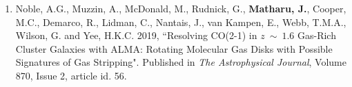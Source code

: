 \documentclass[11pt]{article}
\makeatletter
\newlength{\bibhang}
\newlength{\bibsep}
 {\@listi \global\bibsep\itemsep \global\advance\bibsep by\parsep}
\newenvironment{bibsection}%
        {\begin{enumerate}{}{%
       \setlength{\leftmargin}{\bibhang}%
       \setlength{\itemindent}{-\leftmargin}%
       \setlength{\itemsep}{\bibsep}%
       \setlength{\parsep}{\z@}%
        \setlength{\partopsep}{0pt}%
        \setlength{\topsep}{0pt}}}
        {\end{enumerate}\vspace{-.6\baselineskip}}
\renewcommand{\section}[1]{\pagebreak[3]%
    \hyphenpenalty=10000%
    \vspace{1.3\baselineskip}%
    \phantomsection\addcontentsline{toc}{section}{#1}%
    \noindent\llap{\scshape\smash{\parbox[t]{\marginparwidth}{\raggedright #1}}}%
    \vspace{-\baselineskip}\par}
\makeatother
\begin{document}
\begin{bibsection}
    \item Noble, A.G., Muzzin, A., McDonald, M., Rudnick, G., {\bf Matharu, J.}, Cooper, M.C., Demarco, R., Lidman, C., Nantais, J., van Kampen, E., Webb, T.M.A., Wilson, G. and Yee, H.K.C.  2019, ``Resolving CO(2-1) in $z~\mathtt{\sim}~1.6$ Gas-Rich Cluster Galaxies with ALMA: Rotating Molecular Gas Disks with Possible Signatures of Gas Stripping". Published in \emph{The Astrophysical Journal}, Volume 870, Issue 2, article id. 56.
  
\end{bibsection}



\end{document}
